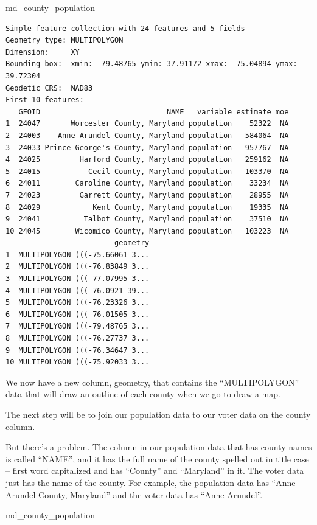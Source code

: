 \documentclass[
  letterpaper,
  DIV=11,
  numbers=noendperiod]{scrreprt}
\newenvironment{Shaded}{\begin{snugshade}}{\end{snugshade}}
\newcommand{\NormalTok}[1]{\textcolor[rgb]{0.00,0.23,0.31}{#1}}
\begin{document}
\begin{Shaded}
\begin{Highlighting}[]
\NormalTok{md\_county\_population}
\end{Highlighting}
\end{Shaded}

\begin{verbatim}
Simple feature collection with 24 features and 5 fields
Geometry type: MULTIPOLYGON
Dimension:     XY
Bounding box:  xmin: -79.48765 ymin: 37.91172 xmax: -75.04894 ymax: 39.72304
Geodetic CRS:  NAD83
First 10 features:
   GEOID                             NAME   variable estimate moe
1  24047       Worcester County, Maryland population    52322  NA
2  24003    Anne Arundel County, Maryland population   584064  NA
3  24033 Prince George's County, Maryland population   957767  NA
4  24025         Harford County, Maryland population   259162  NA
5  24015           Cecil County, Maryland population   103370  NA
6  24011        Caroline County, Maryland population    33234  NA
7  24023         Garrett County, Maryland population    28955  NA
8  24029            Kent County, Maryland population    19335  NA
9  24041          Talbot County, Maryland population    37510  NA
10 24045        Wicomico County, Maryland population   103223  NA
                         geometry
1  MULTIPOLYGON (((-75.66061 3...
2  MULTIPOLYGON (((-76.83849 3...
3  MULTIPOLYGON (((-77.07995 3...
4  MULTIPOLYGON (((-76.0921 39...
5  MULTIPOLYGON (((-76.23326 3...
6  MULTIPOLYGON (((-76.01505 3...
7  MULTIPOLYGON (((-79.48765 3...
8  MULTIPOLYGON (((-76.27737 3...
9  MULTIPOLYGON (((-76.34647 3...
10 MULTIPOLYGON (((-75.92033 3...
\end{verbatim}

We now have a new column, geometry, that contains the ``MULTIPOLYGON''
data that will draw an outline of each county when we go to draw a map.

The next step will be to join our population data to our voter data on
the county column.

But there's a problem. The column in our population data that has county
names is called ``NAME'', and it has the full name of the county spelled
out in title case -- first word capitalized and has ``County'' and
``Maryland'' in it. The voter data just has the name of the county. For
example, the population data has ``Anne Arundel County, Maryland'' and
the voter data has ``Anne Arundel''.

\begin{Shaded}
\begin{Highlighting}[]
\NormalTok{md\_county\_population}
\end{Highlighting}
\end{Shaded}
\end{document}
